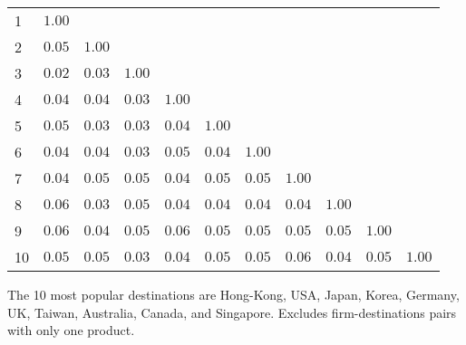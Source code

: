 \documentclass{article}
\begin{document}
\begin{table}[h]
{\begin{threeparttable}
\begin{tabular}{lrrrrrrrrrr}
\cmidrule{2-11} 
1  & $1.00$    &              &             &             &              &            &               &            &              &                        \\  
2  & $0.05$    & $1.00$     &             &             &              &            &               &            &              &                        \\  
3  & $0.02$    & $0.03$     & $1.00$    &             &              &            &               &            &              &                        \\  
4  & $0.04$    & $0.04$     & $0.03$    &  $1.00$   &              &            &               &            &              &                        \\  
5  & $0.05$    & $0.03$     & $0.03$    &  $0.04$   & $1.00$     &            &               &            &              &                        \\  
6  & $0.04$    & $0.04$     & $0.03$    &  $0.05$   & $0.04$     &  $1.00$  &               &            &              &                        \\  
7  & $0.04$    & $0.05$     & $0.05$    &  $0.04$   & $0.05$     &  $0.05$  &  $1.00$     &            &              &                        \\  
8  & $0.06$    & $0.03$     & $0.05$    &  $0.04$   & $0.04$     &  $0.04$  &  $0.04$     & $1.00$   &              &                        \\  
9  & $0.06$    & $0.04$     & $0.05$    &  $0.06$   & $0.05$     &  $0.05$  &  $0.05$     & $0.05$   & $1.00$     &                        \\  
10 & $0.05$   & $0.05$    & $0.03$   &  $0.04$  & $0.05$    &  $0.05$ &  $0.06$    & $0.04$  & $0.05$    &   $1.00$           \\  
\hline
\hline
\end{tabular}
\begin{tablenotes}
\small
\item  \noindent  \footnotesize{The 10 most popular destinations are Hong-Kong, USA, Japan, Korea, Germany, UK, Taiwan, Australia, Canada, and Singapore. Excludes firm-destinations pairs with only one product.}
\end{tablenotes}
\end{threeparttable}
}
\end{table}
\end{document}
